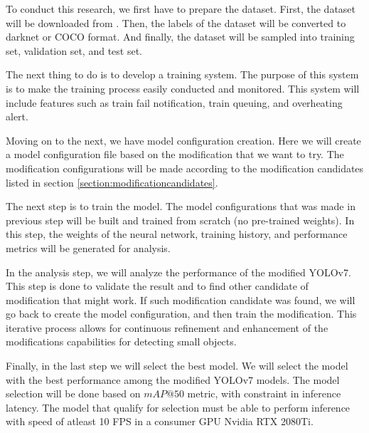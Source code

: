
To conduct this research, we first have to prepare the dataset.
First, the dataset will be downloaded from \textcite{aot_dataset}.
Then, the labels of the dataset will be converted to darknet or COCO format.
And finally, the dataset will be sampled into training set, validation set, and test set.
  
The next thing to do is to develop a training system.
The purpose of this system is to make the training process easily conducted and monitored.
This system will include features such as train fail notification, train queuing, and 
overheating alert.

Moving on to the next, we have model configuration creation. 
Here we will create a model configuration file based on the 
modification that we want to try. 
The modification configurations will be made according to the modification
candidates listed in section \ref{section:modificationcandidates}.

The next step is to train the model.
The model configurations that was made in previous step will be built and trained from scratch (no pre-trained weights).
In this step, the weights of the neural network, training history, and performance metrics will be generated for analysis.

In the analysis step, we will analyze the performance of the modified YOLOv7.
This step is done to validate the result and to find other candidate of modification that might work.
If such modification candidate was found, we will go back to create the model configuration, 
and then train the modification.
This iterative process allows for continuous refinement and enhancement of the 
modifications capabilities for detecting small objects.%

Finally, in the last step we will select the best model.
We will select the model with the best performance among the modified YOLOv7 models.
The model selection will be done based on $mAP@50$ metric, with constraint in inference latency.
The model that qualify for selection must be able to perform inference with speed of atleast 10 FPS in a consumer GPU Nvidia RTX 2080Ti.


